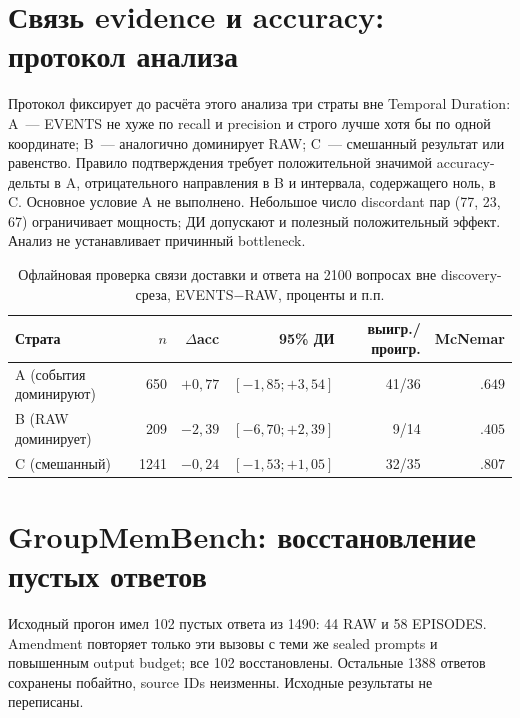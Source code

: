 \documentclass[11pt,a4paper]{article}
\newcommand{\raw}{RAW}
\newcommand{\events}{EVENTS}
\begin{document}
\section{Связь evidence и accuracy: протокол анализа}
\label{app:frontier}

Протокол 
фиксирует до расчёта этого анализа три страты вне Temporal Duration:
A~--- EVENTS не хуже по recall и precision и строго лучше хотя бы по одной
координате; B~--- аналогично доминирует RAW; C~--- смешанный результат
или равенство. Правило подтверждения требует положительной значимой
accuracy-дельты в A, отрицательного направления в B и интервала,
содержащего ноль, в C. Основное условие A не выполнено. Небольшое число
discordant пар (77, 23, 67) ограничивает мощность; ДИ допускают и полезный
положительный эффект. Анализ не устанавливает причинный bottleneck.

\begin{table}[ht]
\centering\small
\begin{tabular}{lrrrrr}
\toprule
Страта & $n$ & $\Delta$acc & 95\% ДИ & выигр./проигр. & McNemar\\
\midrule
A (события доминируют) & 650 & $+0{,}77$ & $[-1{,}85;+3{,}54]$ & 41/36 & $.649$\\
B (\raw{} доминирует) & 209 & $-2{,}39$ & $[-6{,}70;+2{,}39]$ & 9/14 & $.405$\\
C (смешанный) & 1241 & $-0{,}24$ & $[-1{,}53;+1{,}05]$ & 32/35 & $.807$\\
\bottomrule
\end{tabular}
\caption{Офлайновая проверка связи доставки и ответа на 2100 вопросах вне discovery-среза,
\events{}$-$\raw{}, проценты и п.п.}
\label{tab:frontier}
\end{table}

\section{GroupMemBench: восстановление пустых ответов}
\label{app:repair}

Исходный прогон имел 102 пустых ответа из 1490: 44 RAW и 58 EPISODES.
Amendment повторяет только эти вызовы с теми же sealed prompts и повышенным
output budget; все 102 восстановлены. Остальные 1388 ответов сохранены
побайтно, source IDs неизменны. Исходные результаты не переписаны.
\end{document}

